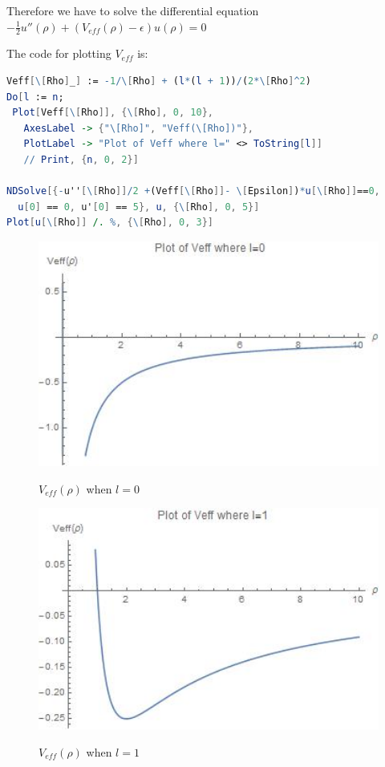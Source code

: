 \documentclass[12pt]{article}
\begin{document}
\begin{spacing}{2.0}
Therefore we have to solve the differential equation $-\frac{1}{2} u''(\rho) + (V_{eff}(\rho)-\epsilon) u(\rho)=0$

The code for plotting $V_{eff}$ is:

\begin{lstlisting}[language=Mathematica,frame=single]
Veff[\[Rho]_] := -1/\[Rho] + (l*(l + 1))/(2*\[Rho]^2)
Do[l := n;
 Plot[Veff[\[Rho]], {\[Rho], 0, 10},
   AxesLabel -> {"\[Rho]", "Veff(\[Rho])"},
   PlotLabel -> "Plot of Veff where l=" <> ToString[l]]
   // Print, {n, 0, 2}]

NDSolve[{-u''[\[Rho]]/2 +(Veff[\[Rho]]- \[Epsilon])*u[\[Rho]]==0,
  u[0] == 0, u'[0] == 5}, u, {\[Rho], 0, 5}]
Plot[u[\[Rho]] /. %, {\[Rho], 0, 3}]
\end{lstlisting}

\begin{figure}
  \centering
  \includegraphics[width=4.5in]{out1}\\
  \caption{$V_{eff}(\rho)$ when $l=0$}\label{out1}
\end{figure}

\begin{figure}
  \centering
  \includegraphics[width=4.5in]{out2}\\
  \caption{$V_{eff}(\rho)$ when $l=1$}\label{out2}
\end{figure}


\end{spacing}
\end{document}
